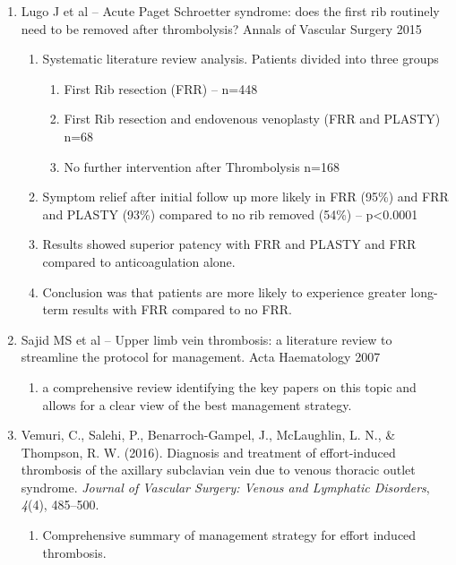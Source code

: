 \documentclass[
]{book}
\providecommand{\tightlist}{%
  \setlength{\itemsep}{0pt}\setlength{\parskip}{0pt}}
\begin{document}
\begin{enumerate}
\def\labelenumi{\arabic{enumi}.}
\item
  Lugo J et al -- Acute Paget Schroetter syndrome: does the first rib
  routinely need to be removed after thrombolysis? Annals of Vascular
  Surgery 2015 \citep{lugoAcutePagetSchroetter2015}

  \begin{enumerate}
  \def\labelenumii{\arabic{enumii}.}
  \item
    Systematic literature review analysis. Patients divided into
    three groups

    \begin{enumerate}
    \def\labelenumiii{\arabic{enumiii}.}
    \item
      First Rib resection (FRR) -- n=448
    \item
      First Rib resection and endovenous venoplasty (FRR and
      PLASTY) n=68
    \item
      No further intervention after Thrombolysis n=168
    \end{enumerate}
  \item
    Symptom relief after initial follow up more likely in FRR (95\%)
    and FRR and PLASTY (93\%) compared to no rib removed (54\%) --
    p\textless0.0001
  \item
    Results showed superior patency with FRR and PLASTY and FRR
    compared to anticoagulation alone.~
  \item
    Conclusion was that patients are more likely to experience
    greater long-term results with FRR compared to no FRR.~
  \end{enumerate}
\item
  Sajid MS et al -- Upper limb vein thrombosis: a literature review to
  streamline the protocol for management. Acta Haematology 2007
  \citep{sajidUpperLimbDeep2007}

  \begin{enumerate}
  \def\labelenumii{\arabic{enumii}.}
  \tightlist
  \item
    a comprehensive review identifying the key papers on this topic
    and allows for a clear view of the best management strategy.
  \end{enumerate}
\item
  Vemuri, C., Salehi, P., Benarroch-Gampel, J., McLaughlin, L. N., \&
  Thompson, R. W. (2016). Diagnosis and treatment of effort-induced
  thrombosis of the axillary subclavian vein due to venous thoracic
  outlet syndrome. \emph{Journal of Vascular Surgery: Venous and Lymphatic
  Disorders}, \emph{4}(4), 485--500.
  \citep{vemuriDiagnosisTreatmentEffortinduced2016}

  \begin{enumerate}
  \def\labelenumii{\arabic{enumii}.}
  \tightlist
  \item
    Comprehensive summary of management strategy for effort induced
    thrombosis.
  \end{enumerate}
\end{enumerate}
\end{document}

